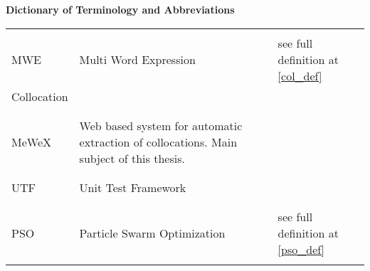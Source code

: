 \textbf{\LARGE Dictionary of Terminology and Abbreviations}

\vspace{1cm}

{\centering
\begin{tabular*}{\textwidth}{L{0.2\textwidth} L{0.5\textwidth} L{0.25\textwidth}}%
    \hline \\
    MWE & Multi Word Expression & see full definition at \ref{col_def}\\
    Collocation &  \\
    \\ \hline \\
    MeWeX & Web based system for automatic extraction of collocations. Main subject of this thesis. \\
    \\ \hline \\
    UTF & Unit Test Framework \\
    \\ \hline \\
    PSO & Particle Swarm Optimization & see full definition at \ref{pso_def}\\
    \\\hline
\end{tabular*} }
    